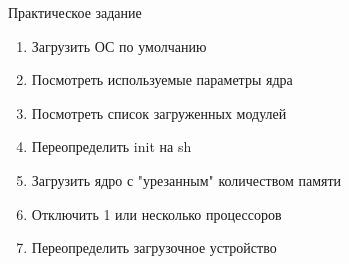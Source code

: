 \documentclass[ignorenonframetext, professionalfonts, hyperref={pdftex, unicode}]{beamer}
\begin{document}
\begin{frame}{Практическое задание}
	\begin{enumerate}
		\item Загрузить ОС по умолчанию
		\item Посмотреть используемые параметры ядра 
		\item Посмотреть список загруженных модулей
			\pause
		\item Переопределить init на sh
		\item Загрузить ядро с "урезанным" количеством памяти
		\item Отключить 1 или несколько процессоров
			\pause
		\item Переопределить загрузочное устройство
	\end{enumerate}
\end{frame}
\end{document}
